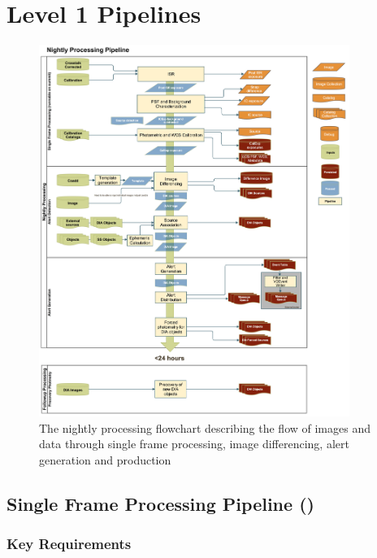 \section{Level 1 Pipelines}
\label{sec:ap}

\begin{figure}[th]
\begin{center}
\includegraphics[width=0.9\textwidth]{figures/Level_1_Processing_Flowchart.jpg}
\caption{\label{fig:nightly} The nightly processing flowchart
  describing the flow of images and data through single frame
  processing, image differencing, alert generation and production}
\end{center}
\end{figure}

\subsection{Single Frame Processing Pipeline (\wbsSFM)}
\label{sec:apSingleFrameProcessing}

\subsubsection{Key Requirements}

